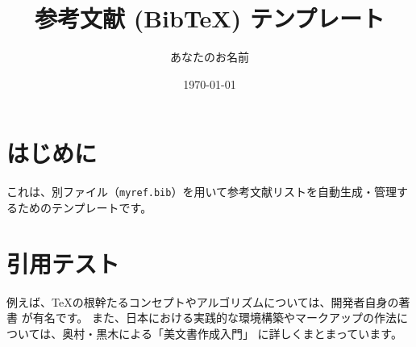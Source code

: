 \documentclass[uplatex,dvipdfmx]{jlreq}
\title{参考文献 (BibTeX) テンプレート}
\author{あなたのお名前}
\date{\today}
\begin{document}
\maketitle

\section{はじめに}
これは、別ファイル（\texttt{myref.bib}）を用いて参考文献リストを自動生成・管理するためのテンプレートです。

\section{引用テスト}
例えば、TeXの根幹たるコンセプトやアルゴリズムについては、開発者自身の著書 \cite{knuth84} が有名です。
また、日本における実践的な環境構築やマークアップの作法については、奥村・黒木による「美文書作成入門」 \cite{okumura2023} に詳しくまとまっています。

\vspace{2em}





\end{document}
